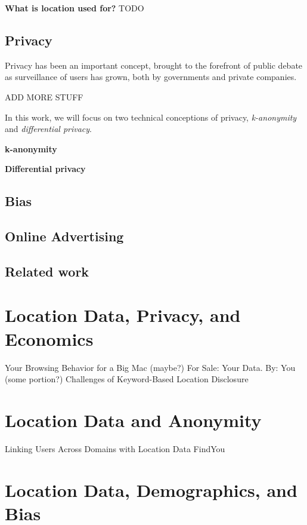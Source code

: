 \documentclass[12pt]{article}
\begin{document}
\textbf{What is location used for?}
TODO



\subsection{Privacy}
\label{ssec:privacy}
Privacy has been an important concept, brought to the forefront of public debate as surveillance of users has grown, both by governments and private companies.

ADD MORE STUFF

In this work, we will focus on two technical conceptions of privacy, \emph{k-anonymity} and \emph{differential privacy}.

\textbf{k-anonymity} 

\textbf{Differential privacy}


\subsection{Bias}

\subsection{Online Advertising}


\subsection{Related work}
\label{sec:related}


\section{Location Data, Privacy, and Economics}
\label{sec:econ}

Your Browsing Behavior for a Big Mac (maybe?)
For Sale: Your Data. By: You (some portion?)
Challenges of Keyword-Based Location Disclosure



\section{Location Data and Anonymity}
\label{sec:anon}
Linking Users Across Domains with Location Data
FindYou



\section{Location Data, Demographics, and Bias}
\label{sec:bias}
\end{document}
